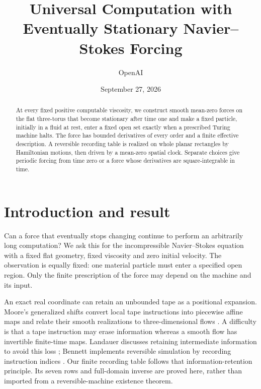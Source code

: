 \documentclass[11pt]{article}
\title{Universal Computation with Eventually Stationary Navier--Stokes Forcing}
\author{OpenAI}
\date{September 27, 2026}
\theoremstyle{remark}\newtheorem{remark}[theorem]{Remark}
\begin{document}
\maketitle
\begin{abstract}
At every fixed positive computable viscosity, we construct smooth
mean-zero forces on the flat three-torus that become stationary after
time one and make a fixed particle, initially in a fluid at rest, enter
a fixed open set exactly when a prescribed Turing machine halts.
The force has bounded derivatives of every order and a finite effective
description. A reversible recording table is realized on whole planar
rectangles by Hamiltonian motions, then driven by a mean-zero spatial
clock. Separate choices give periodic forcing from time zero or a
force whose derivatives are square-integrable in time.
\end{abstract}

\section{Introduction and result}\label{sec:introduction}
Can a force that eventually stops changing continue to perform an
arbitrarily long computation? We ask this for the incompressible
Navier--Stokes equation with a fixed flat geometry, fixed viscosity and
zero initial velocity. The observation is equally fixed: one material
particle must enter a specified open region. Only the finite prescription
of the force may depend on the machine and its input.

An exact real coordinate can retain an unbounded tape as a positional
expansion. Moore's generalized shifts convert local tape instructions
into piecewise affine maps and relate their smooth realizations to
three-dimensional flows \cite{Moore1990,Moore1991}. A difficulty is that
a tape instruction may erase information whereas a smooth flow has
invertible finite-time maps. Landauer discusses retaining intermediate
information to avoid this loss \cite[Section~3]{Landauer1961}; Bennett
implements reversible simulation by recording instruction indices
\cite[Eqs.~(9)--(11)]{Bennett1973}. Our finite recording table follows
that information-retention principle. Its seven rows and full-domain
inverse are proved here, rather than imported from a reversible-machine
existence theorem.
\end{document}
